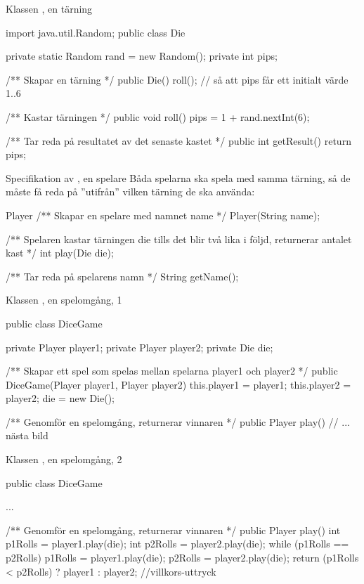 \documentclass{lecturenotes}
\begin{document}
\begin{Slide}
{Klassen , en tärning}
\begin{Code}
import java.util.Random;
public class Die {
    private static Random rand = new Random();
    private int pips;

    /** Skapar en tärning */
    public Die() {
        roll(); // så att pips får ett initialt värde 1..6
    }
    
    /** Kastar tärningen */
    public void roll() {
        pips = 1 + rand.nextInt(6);
    }
    
    /** Tar reda på resultatet av det senaste kastet */
    public int getResult() {
        return pips;
    }
}
\end{Code}
\end{Slide} 

\begin{Slide}
{Specifikation av , en spelare}
Båda spelarna ska spela med samma tärning, så de måste få reda på ''utifrån'' vilken tärning de ska använda:

\begin{ClassSpec}{Player}
/** Skapar en spelare med namnet name */
Player(String name);

/** Spelaren kastar tärningen die tills det blir 
    två lika i följd, returnerar antalet kast */
int play(Die die);

/** Tar reda på spelarens namn */
String getName();
\end{ClassSpec}
\end{Slide} 

\begin{Slide}
{Klassen , en spelomgång, 1}
\begin{Code}
public class DiceGame {
    private Player player1;
    private Player player2;
    private Die die;
    
    /** Skapar ett spel som spelas mellan spelarna
        player1 och player2 */
    public DiceGame(Player player1, Player player2) {
        this.player1 = player1;
        this.player2 = player2;
        die = new Die();
    }
    
    /** Genomför en spelomgång, returnerar vinnaren */
    public Player play() {
        // ... nästa bild
    }
}
\end{Code}
\end{Slide} 

\begin{Slide}
{Klassen , en spelomgång, 2}
\begin{Code}
public class DiceGame {
    ...
    
    /** Genomför en spelomgång, returnerar vinnaren */
    public Player play() {
        int p1Rolls = player1.play(die);
        int p2Rolls = player2.play(die);
        while (p1Rolls == p2Rolls) {
            p1Rolls = player1.play(die);
            p2Rolls = player2.play(die);
        }
        return (p1Rolls < p2Rolls) ? player1 : player2;  //villkors-uttryck
    }
}
\end{Code}
\end{Slide} 
\end{document}
